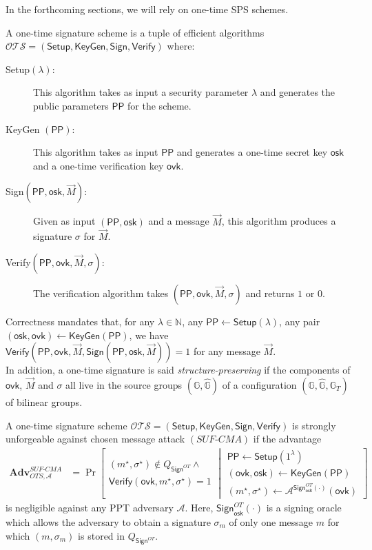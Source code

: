 \documentclass[10pt]{llncs}
\newcommand{\OTS}{\mathcal{OTS}}
\newcommand{\Adv}{\mathbf{Adv}}
\newcommand{\A}{\mathcal{A}}
\newcommand{\G}{\mathbb{G}}
\newcommand{\ovk}{\mathsf{ovk}}
\newcommand{\osk}{\mathsf{osk}}
\newcommand{\Setup}{{\mathsf{Setup}}}
\newcommand{\KeyGen}{{\mathsf{KeyGen}}}
\newcommand{\Sig}{{\mathsf{Sign}}}
\newcommand{\Verif}{{\mathsf{Verify}}}
\newcommand{\PPP}{\mathsf{PP}}
\begin{document}
In the forthcoming sections, we will rely on  one-time SPS schemes.
\begin{definition}
  A one-time signature scheme is a tuple of efficient algorithms $\OTS = (\Setup, \KeyGen, \Sig, \Verif)$ where:
  \begin{description}
  \item[\textsf{Setup}$({\lambda}) :$] This algorithm takes as input a security parameter $\lambda$ and generates the public parameters $\PPP$ for the scheme.
 \item[\textsf{KeyGen} $(\PPP):$] This algorithm takes as input $\PPP$ and generates a one-time secret key $\osk$ and a one-time verification key $\ovk$.
  \item[\textsf{Sign}$(\PPP, \osk, \vec{M})  :$] Given  as input $(\PPP, \osk)$ and a message $\vec{M}$, this algorithm produces a signature $\sigma$ for  $\vec{M}$.
  \item[\textsf{Verify}$(\PPP, \ovk, \vec{M}, \sigma) :$] The verification algorithm takes $(\PPP, \ovk, \vec{M}, \sigma)$ and returns $1$ or $0$.
  \end{description}
\end{definition}

Correctness  mandates that, for any $\lambda \in \mathbb{N}$,  any $\PPP \leftarrow \mathsf{Setup}(\lambda)$,  any pair $(\osk,\ovk) \leftarrow \mathsf{KeyGen}(\PPP)$, we have $\Verif(\PPP, \ovk, \vec{M}, \Sig(\PPP, \osk, \vec{M})) =1$ for any message $\vec{M}$.\\
\indent In addition, a one-time signature is said {\it structure-preserving} if the components of $\ovk$, $\vec{M}$ and $\sigma$ all live in 
the source groups $(\G,\hat{\G})$ of a configuration $(\G,\hat{\G},\G_T)$ of bilinear groups. 

 
\begin{definition}
  A one-time signature scheme  $\OTS = (\Setup, \KeyGen, \Sig, \Verif)$ is strongly unforgeable against  chosen
	message attack $(SUF\textrm{-}CMA)$ if the advantage
  \begin{align*}
    \Adv_{OTS,\A}^{SUF\textrm{-}CMA} &= \Pr \left[
			\begin{array}{l}
      (m^\star, \sigma^\star) \not \in Q_{\Sig^{OT}} \wedge\\
      \Verif(\ovk, m^\star, \sigma^\star) =1
    \end{array}
				    \middle| 
	                              \begin{array}{l}
                                \PPP \gets \Setup(1^{\lambda})\\
                                (\ovk,\osk) \gets \KeyGen(\PPP)\\
                                (m^\star,\sigma^\star) \gets \A^{\Sig^{OT}_{\osk}(\cdot)}(\ovk)
                              \end{array}  
    \right]
  \end{align*}
  is negligible against any PPT adversary $\mathcal{A}$. Here, $\Sig^{OT}_{\osk}(\cdot)$ is a signing oracle which  allows the adversary to obtain a  signature $\sigma_m$ of only one message $m$ for which $(m, \sigma_m)$ is stored in $Q_{\Sig^{OT}}$. 
\end{definition}
\end{document}
